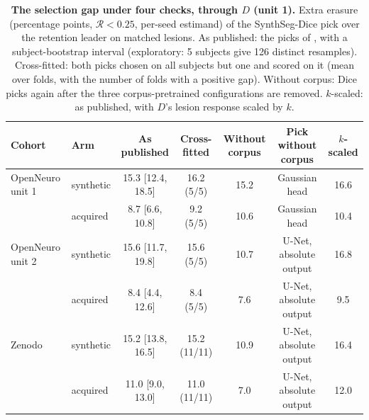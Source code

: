 \begin{table}[!htbp]
{\caption{\textbf{The selection gap under four checks, through $D$ (unit 1).} Extra erasure (percentage points, $\mathcal{R}<0.25$, per-seed estimand) of the SynthSeg-Dice pick over the retention leader on matched lesions. As published: the picks of , with a subject-bootstrap interval (exploratory: 5 subjects give 126 distinct resamples). Cross-fitted: both picks chosen on all subjects but one and scored on it (mean over folds, with the number of folds with a positive gap). Without corpus: Dice picks again after the three corpus-pretrained configurations are removed. $k$-scaled: as published, with $D$'s lesion response scaled by $k$.}}
{\scriptsize\setlength{\tabcolsep}{2.5pt}\begin{tabular*}{\linewidth}{@{\extracolsep{\fill}}llccccc@{}}
\toprule
Cohort & Arm & As published & Cross-fitted & Without corpus & Pick without corpus & $k$-scaled \\
\midrule
OpenNeuro unit 1 & synthetic & 15.3 [12.4, 18.5] & 16.2 (5/5) & 15.2 & Gaussian head & 16.6 \\
 & acquired & 8.7 [6.6, 10.8] & 9.2 (5/5) & 10.6 & Gaussian head & 10.4 \\
OpenNeuro unit 2 & synthetic & 15.6 [11.7, 19.8] & 15.6 (5/5) & 10.7 & U-Net, absolute output & 16.8 \\
 & acquired & 8.4 [4.4, 12.6] & 8.4 (5/5) & 7.6 & U-Net, absolute output & 9.5 \\
Zenodo & synthetic & 15.2 [13.8, 16.5] & 15.2 (11/11) & 10.9 & U-Net, absolute output & 16.4 \\
 & acquired & 11.0 [9.0, 13.0] & 11.0 (11/11) & 7.0 & U-Net, absolute output & 12.0 \\
\bottomrule
\end{tabular*}}
\end{table}
